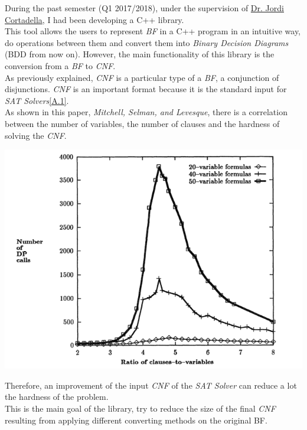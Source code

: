 During the past semester (Q1 2017/2018), under the supervision of \href{https://www.cs.upc.edu/~jordicf/}{Dr. Jordi Cortadella}, I had been developing a C++ library.\\
This tool allows the users to represent \emph{BF} in a C++ program in an intuitive way, do operations between them and convert them into \emph{Binary Decision Diagrams} (BDD from now on). However, the main functionality of this library is the conversion from a \emph{BF} to \emph{CNF}.  \\
As previously explained, \emph{CNF} is a particular type of a \emph{BF}, a conjunction of disjunctions. \emph{CNF} is an important format because it is the standard input for \emph{SAT Solvers}\ref{A.1}.\\
As shown in this paper, \emph{Mitchell, Selman, and Levesque\cite{Mitchell}}, there is a correlation between the number of variables, the number of clauses and the hardness of solving the \emph{CNF}.
\begin{center}
	\includegraphics[width=1\textwidth]{Figures/GraphMitchellSelmanLevesque.png}
\end{center}
Therefore, an improvement of the input \emph{CNF} of the \emph{SAT Solver} can reduce a lot the hardness of the problem. \\
This is the main goal of the library, try to reduce the size of the final \emph{CNF} resulting from applying different converting methods on the original BF.


